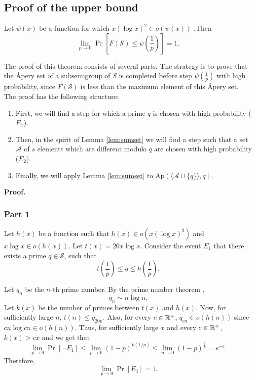 \subsection{Proof of the upper bound} 
\begin{lemma}\label{lem:upperbound}
    Let $\psi(x)$ be a function for which $x(\log x)^2 \in o(\psi(x))$ .Then
    \[\lim_{p \to 0}\Pr\left[F(\mathcal{S}) \leq \psi\left(\frac{1}{p}\right)\right] = 1.\] 
\end{lemma}

\par The proof of this theorem consists of several parts. The strategy is to prove that the Ápery set of a subsemigroup of $S$ is completed before step $\psi\left(\frac{1}{p}\right)$ with high probability, since $F(\mathcal{S})$ is less than the maximum element of this Ápery set. The proof has the following structure: 
\begin{enumerate}
\item First, we will find a step for which a prime $q$ is chosen with high probability ($E_1$). 
\item Then, in the spirit of Lemma \ref{lem:sumset} we will find a step such that a set $\mathcal{A}$ of $s$ elements which are different modulo $q$ are chosen with high probability ($E_2$). 
\item Finally, we will apply Lemma \ref{lem:sumset} to $\mathrm{Ap}(\langle \mathcal{A} \cup \{q\}\rangle, q)$.
\end{enumerate}
\textbf{Proof. }
\subsubsection*{Part 1} 
Let \(h(x)\) be a function such that \(h(x) \in o(x (\log x)^2)\) and \(x\log x \in o(h(x))\). Let $t(x) = 20x \log x$. Consider the event
$E_1$ that there exists a prime $q \in \mathcal{S}$, such that 
\[t\left(\frac{1}{p}\right) \leq q \leq h\left(\frac{1}{p}\right).\]
\par 
Let $q_n$ be the $n$-th prime number. By the prime number theorem \cite[Theorem 8]{hardy1979introduction}, 
\begin{equation}\label{eq:pnt}
q_n \sim n \log n.
\end{equation}
Let $k(x)$ be the number of primes between $t(x)$ and $h(x)$. Now, for sufficiently large $n$, $t(n) \leq q_{20n}$. Also, for every $c \in \mathbb{R}^+$, $q_{cn} \in o(h(n))$ since $cn\log cn \in o(h(n))$. Thus, for sufficiently large $x$ and every $c \in \mathbb{R}^+$, $k(x) > cx$
and we get that
\[\lim_{p \to 0}\Pr[\lnot E_1] \leq \lim_{p \to 0} (1 - p)^{k(1/p)} \leq \lim_{p \to 0} (1 - p)^{\frac{c}{p}} = e^{-c}.\]
Therefore, 
\begin{equation}\label{eq:upperbound:e1}
    \lim_{p \to 0}\Pr[E_1] = 1.
\end{equation}
